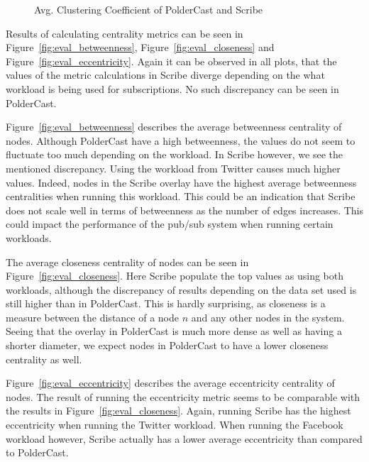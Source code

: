 \begin{figure}[H]
    \centering
    
    \caption{Avg. Clustering Coefficient of PolderCast and Scribe}
    \label{fig:eval_cc}
\end{figure}


Results of calculating centrality metrics can be seen in
Figure~\ref{fig:eval_betweenness}, Figure~\ref{fig:eval_closeness} and
Figure~\ref{fig:eval_eccentricity}. Again it can be observed in all
plots, that the values of the metric calculations in Scribe diverge
depending on the what workload is being used for subscriptions. No such
discrepancy can be seen in PolderCast.

Figure~\ref{fig:eval_betweenness} describes the average betweenness
centrality of nodes. Although PolderCast have a high betweenness, the
values do not seem to fluctuate too much depending on the workload. In
Scribe however, we see the mentioned discrepancy. Using the workload
from Twitter causes much higher values. Indeed, nodes in the Scribe
overlay have the highest average betweenness centralities when running
this workload. This could be an indication that Scribe does not scale
well in terms of betweenness as the number of edges increases. This
could impact the performance of the pub/sub system when running certain
workloads.

The average closeness centrality of nodes can be seen in
Figure~\ref{fig:eval_closeness}. Here Scribe populate the top values as
using both workloads, although the discrepancy of results depending on
the data set used is still higher than in PolderCast. This is hardly
surprising, as closeness is a measure between the distance of a node
$n$ and any other nodes in the system. Seeing that the overlay in
PolderCast is much more dense as well as having a shorter diameter, we
expect nodes in PolderCast to have a lower closeness centrality as
well.

Figure~\ref{fig:eval_eccentricity} describes the average eccentricity
centrality of nodes. The result of running the eccentricity metric seems
to be comparable with the results in Figure~\ref{fig:eval_closeness}.
Again, running Scribe has the highest eccentricity when running the
Twitter workload. When running the Facebook workload however, Scribe
actually has a lower average eccentricity than compared to PolderCast.

